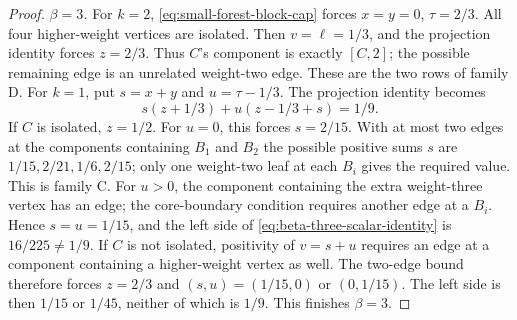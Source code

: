 \documentclass[11pt,reqno]{amsart}
\theoremstyle{definition}
\theoremstyle{remark}
\numberwithin{equation}{section}
\begin{document}
\begin{proof}
\emph{$\beta=3$.}
For $k=2$, \eqref{eq:small-forest-block-cap} forces
$x=y=0$, $\tau=2/3$. All four higher-weight vertices are isolated.
Then $v=\ell=1/3$, and the projection identity forces $z=2/3$.
Thus $C$'s component is exactly $[C,2]$; the possible remaining edge is
an unrelated weight-two edge. These are the two rows of family D.
For $k=1$, put $s=x+y$ and $u=\tau-1/3$. The projection identity becomes
\begin{equation}\label{eq:beta-three-scalar-identity}
 s(z+1/3)+u(z-1/3+s)=1/9.
\end{equation}
If $C$ is isolated, $z=1/2$. For $u=0$, this forces $s=2/15$.
With at most two edges at the components containing $B_1$ and $B_2$ the possible
positive sums $s$ are $1/15,2/21,1/6,2/15$; only one weight-two leaf
at each $B_i$ gives the required value. This is family C.
For $u>0$, the component containing the extra weight-three vertex has an edge; the core-boundary
condition requires another edge at a $B_i$. Hence $s=u=1/15$, and the
left side of \eqref{eq:beta-three-scalar-identity} is $16/225\ne1/9$.
If $C$ is not isolated, positivity of $v=s+u$ requires an edge at a component containing a higher-weight vertex as well. The two-edge bound therefore forces
$z=2/3$ and $(s,u)=(1/15,0)$ or $(0,1/15)$.
The left side is then $1/15$ or $1/45$, neither of which is $1/9$.
This finishes $\beta=3$.


\end{proof}
\end{document}
